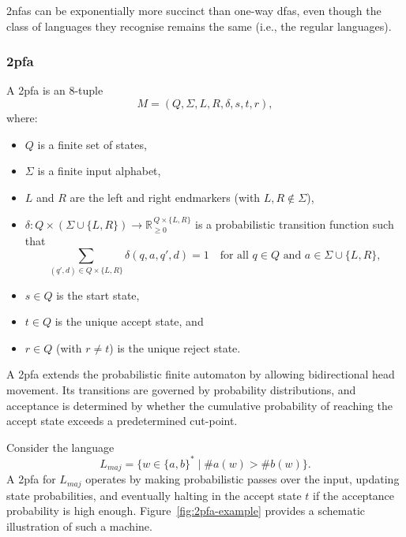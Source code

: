 \begin{observation}
\glspl{2nfa} can be exponentially more succinct than one-way \glspl{dfa}, even though the class of languages they recognise remains the same (i.e., the regular languages).
\end{observation}


\subsubsection{\acrfull{2pfa}}
\label{subsubsec:2pfa}

\begin{definition}
A \gls{2pfa} is an 8-tuple
\[
M = (Q, \Sigma, L, R, \delta, s, t, r),
\]
where:
\begin{itemize}
    \item \(Q\) is a finite set of states,
    \item \(\Sigma\) is a finite input alphabet,
    \item \(L\) and \(R\) are the left and right endmarkers (with \(L,R \notin \Sigma\)),
    \item \(\delta: Q \times (\Sigma \cup \{L,R\}) \to \mathbb{R}_{\ge 0}^{\,Q \times \{L,R\}}\) is a probabilistic transition function such that
    \[
    \sum_{(q',d)\in Q\times\{L,R\}} \delta(q,a,q',d) = 1 \quad \text{for all } q \in Q \text{ and } a \in \Sigma \cup \{L,R\},
    \]
    \item \(s\in Q\) is the start state,
    \item \(t\in Q\) is the unique accept state, and
    \item \(r\in Q\) (with \(r\neq t\)) is the unique reject state.
\end{itemize}
\end{definition}

\begin{remark}
A \gls{2pfa} extends the probabilistic finite automaton by allowing bidirectional head movement. Its transitions are governed by probability distributions, and acceptance is determined by whether the cumulative probability of reaching the accept state exceeds a predetermined cut-point.
\end{remark}

\begin{example}
Consider the language 
\[
L_{maj} = \{ w \in \{a,b\}^* \mid \#a(w) > \#b(w) \}.
\]
A \gls{2pfa} for \(L_{maj}\) operates by making probabilistic passes over the input, updating state probabilities, and eventually halting in the accept state \(t\) if the acceptance probability is high enough. Figure~\ref{fig:2pfa-example} provides a schematic illustration of such a machine.
\end{example}

